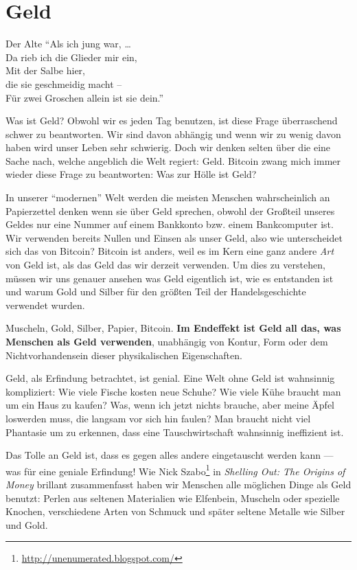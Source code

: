 \chapter{Geld}
\label{les:11}

\begin{chapquote}{Der Alte}
\enquote{Als ich jung war, \ldots \\
Da rieb ich die Glieder mir ein, \\
Mit der Salbe hier, \\
die sie geschmeidig macht -- \\
Für zwei Groschen allein ist sie dein.}
\end{chapquote}

Was ist Geld? Obwohl wir es jeden Tag benutzen, ist diese Frage überraschend
schwer zu beantworten. Wir sind davon abhängig und wenn wir zu wenig davon haben
wird unser Leben sehr schwierig. Doch wir denken selten über die eine Sache
nach, welche angeblich die Welt regiert: Geld. Bitcoin zwang mich immer wieder
diese Frage zu beantworten: Was zur Hölle ist Geld?

In unserer \enquote{modernen} Welt werden die meisten Menschen wahrscheinlich an
Papierzettel denken wenn sie über Geld sprechen, obwohl der Großteil unseres
Geldes nur eine Nummer auf einem Bankkonto bzw. einem Bankcomputer ist. Wir
verwenden bereits Nullen und Einsen als unser Geld, also wie unterscheidet sich
das von Bitcoin? Bitcoin ist anders, weil es im Kern eine ganz andere
\textit{Art} von Geld ist, als das Geld das wir derzeit verwenden. Um dies zu
verstehen, müssen wir uns genauer ansehen was Geld eigentlich ist, wie es
entstanden ist und warum Gold und Silber für den größten Teil der
Handelsgeschichte verwendet wurden.

\newpage

Muscheln, Gold, Silber, Papier, Bitcoin. \textbf{Im Endeffekt ist Geld all das,
was Menschen als Geld verwenden}, unabhängig von Kontur, Form
oder dem Nichtvorhandensein dieser physikalischen Eigenschaften.

Geld, als Erfindung betrachtet, ist genial. Eine Welt ohne Geld ist wahnsinnig
kompliziert: Wie viele Fische kosten neue Schuhe? Wie viele Kühe braucht man um
ein Haus zu kaufen? Was, wenn ich jetzt nichts brauche, aber meine Äpfel
loswerden muss, die langsam vor sich hin faulen? Man braucht nicht viel Phantasie
um zu erkennen, dass eine Tauschwirtschaft wahnsinnig ineffizient ist.

Das Tolle an Geld ist, dass es gegen alles andere eingetauscht werden kann ---
was für eine geniale Erfindung! Wie Nick
Szabo\footnote{\url{http://unenumerated.blogspot.com/}} in \textit{Shelling Out:
The Origins of Money} \cite{shelling-out} brillant zusammenfasst haben wir
Menschen alle möglichen Dinge als Geld benutzt: Perlen aus seltenen Materialien
wie Elfenbein, Muscheln oder spezielle Knochen, verschiedene Arten von Schmuck
und später seltene Metalle wie Silber und Gold.

